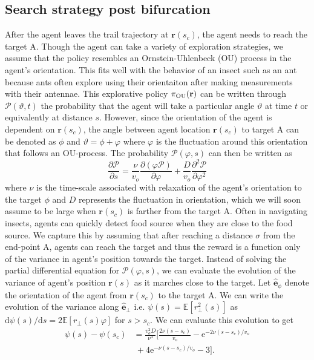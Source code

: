\documentclass[%
reprint,
superscriptaddress,
floatfix,
amsmath,
amssymb,
aps,
notitlepage
]{revtex4-1}
\def\d{\text{d}}
\def\e{\text{e}}
\def\r{\mathbf{r}}
\def\E{\mathbb{E}}
\def\P{\mathcal{P}}
\def\theta{\vartheta}
\def\OU{\rm OU}
\def\ebh{\hat{\mathbf{e}}}
\begin{document}
\subsection*{Search strategy post bifurcation}
After the agent leaves the trail trajectory at $\r(s_c)$, the agent needs to reach the target A.
Though the agent can take a variety of exploration strategies, we assume that the policy resembles
an Ornstein-Uhlenbeck (OU) process in the agent's orientation. This fits well with the behavior of an insect such as an ant because
ants often explore using their orientaiton after making measurements with their antennae.
This explorative policy $\pi_{\OU}(\r)$ can be written through $\P(\theta, t)$
the probability that the agent will take a particular angle $\theta$ at time $t$ or equivalently at distance $s$.
However, since the orientation of the agent is dependent on $\r(s_c)$, the angle between agent location $\r(s_c)$
to target A can be denoted as $\phi$ and $\theta=\phi+\varphi$ where $\varphi$ is the fluctuation around this
orientation that follows an OU-process. The probability $\P(\varphi, s)$ can then be written as
\[
    \frac{\partial \P}{\partial s} = \frac{\nu}{v_o} \frac{\partial(\varphi \P)}{\partial \varphi }
    + \frac{D}{v_o} \frac{\partial^2 \P}{\partial \varphi^2}
\]
where $\nu$ is the time-scale associated with relaxation of the agent's orientation to the target $\phi$
and $D$ represents the fluctuation in orientation, which we will soon assume to be large when $\r(s_c)$
is farther from the target A. Often in navigating insects, agents can quickly detect food source when they
are close to the food source. We capture this by assuming that after reaching a distance $\sigma$ from the end-point A,
agents can reach the target and thus the reward is a function only of the variance in agent's position towards the
target. Instead of solving the partial differential equation for $\P(\varphi, s)$, we can evaluate the
evolution of the variance of agent's position $\r(s)$ as it marches close to the target. Let $\ebh_\phi$
denote the orientation of the agent from $\r(s_c)$ to the target A. We can write the evolution of the variance
along $\ebh_\perp$ i.e. $\psi(s)=\E[r^2_\perp(s)]$ as $\d{\psi}(s)/\d s = 2 \E [ r_\perp(s) \varphi ]$ for $s>s_c$.
We can evaluate this evolution to get
\begin{align}
    \psi(s) - \psi(s_c) & = \frac{v_o^2 D}{\nu^3} \bigg[ \frac{2 \nu (s-s_c)}{v_o} - \e^{-2 \nu (s-s_c)/v_o} \nonumber \\
    & \ + 4 \e^{-\nu (s-s_c)/v_o} - 3 \bigg].
\end{align}
\end{document}
